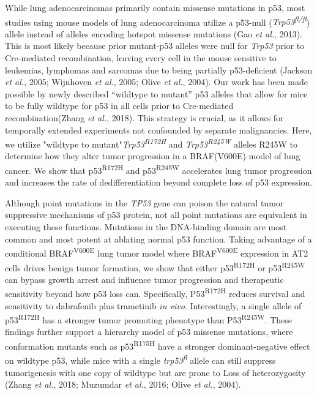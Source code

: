 While lung adenocarcinomas primarily contain missense mutations in p53, most studies using mouse models of lung adenocarcinoma utilize a p53-null (\emph{Trp53\textsuperscript{fl/fl}}) allele instead of alleles encoding hotspot missense mutations (Gao \emph{et al.}, 2013). This is most likely because prior mutant-p53 alleles were null for \emph{Trp53} prior to Cre-mediated recombination, leaving every cell in the mouse sensitive to leukemias, lymphomas and sarcomas due to being partially p53-deficient (Jackson \emph{et al.}, 2005; Wijnhoven \emph{et al.}, 2005; Olive \emph{et al.}, 2004). Our work has been made possible by newly described ``wildtype to mutant'' p53 alleles that allow for mice to be fully wildtype for p53 in all cells prior to Cre-mediated recombination(Zhang \emph{et al.}, 2018). This strategy is crucial, as it allows for temporally extended experiments not confounded by separate malignancies. Here, we utilize "wildtype to mutant"\emph{Trp53\textsuperscript{R172H}} and \emph{Trp53\textsuperscript{R245W}} alleles R245W to determine how they alter tumor progression in a BRAF(V600E) model of lung cancer. We show that p53\textsuperscript{R172H} and p53\textsuperscript{R245W} accelerates lung tumor progression and increases the rate of dedifferentiation beyond complete loss of p53 expression.

Although point mutations in the \emph{TP53} gene can poison the natural tumor suppressive mechanisms of p53 protein, not all point mutations are equivalent in executing these functions. Mutations in the DNA-binding domain are most common and most potent at ablating normal p53 function. Taking advantage of a conditional BRAF\textsuperscript{V600E} lung tumor model where BRAF\textsuperscript{V600E} expression in AT2 cells drives benign tumor formation, we show that either p53\textsuperscript{R172H} or p53\textsuperscript{R245W} can bypass growth arrest and influence tumor progression and therapeutic sensitivity beyond how p53 loss can. Specifically, P53\textsuperscript{R172H} reduces survival and sensitivity to dabrafenib plus trametinib \emph{in vivo}. Interestingly, a single allele of p53\textsuperscript{R172H} has a stronger tumor promoting phenotype than P53\textsuperscript{R245W}. These findings further support a hierarchy model of p53 missense mutations, where conformation mutants such as p53\textsuperscript{R175H} have a stronger dominant-negative effect on wildtype p53, while mice with a single \emph{trp53\textsuperscript{fl}} allele can still suppress tumorigenesis with one copy of wildtype but are prone to Loss of heterozygosity (Zhang \emph{et al.}, 2018; Muzumdar \emph{et al.}, 2016; Olive \emph{et al.}, 2004).

